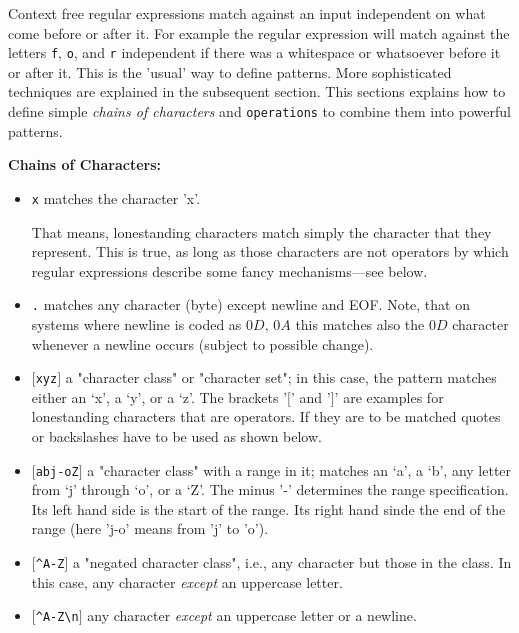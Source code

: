 Context free regular expressions match against an input independent on what 
 come before or after it. For example the regular expression 
 will match against the letters {\tt f}, {\tt o}, and {\tt r} independent
 if there was a whitespace or whatsoever before it or after it. This is
 the 'usual' way to define patterns. More sophisticated techniques are 
 explained in the subsequent section. This sections explains how to 
 define simple {\it chains of characters} and {\tt operations}
 to combine them into powerful patterns.
 \vskip0.5cm

{\bf Chains of Characters:}

\begin{itemize}
\item {\tt x} matches the character 'x'. 

     That means, lonestanding characters match simply the character that they represent.
     This is true, as long as those characters are not operators by which regular
     expressions describe some fancy mechanisms---see below.

\item {\tt .} matches any character (byte) except newline and EOF. Note, that on systems
      where newline is coded as $0D,\,0A$ this matches also the $0D$ character whenever 
      a newline occurs (subject to possible change).

\item {\tt $[$xyz$]$}
     a "character class" or "character set"; in this case, the pattern matches either an
     `x', a `y', or a `z'. The brackets '$[$' and '$]$' are examples for lonestanding
     characters that are operators. If they are to be matched quotes or backslashes
     have to be used as shown below.

\item {\tt $[$abj-oZ$]$}
     a "character class" with a range in it; matches an `a', a `b', any
     letter from `j' through `o', or a `Z'. The minus '-' determines the
     range specification. Its left hand side is the start of the range.
     Its right hand sinde the end of the range (here 'j-o' means from 'j' to 'o').

\item {\tt $[$\verb|^|A-Z$]$}
     a "negated character class", i.e., any character but those in the
     class.  In this case, any character {\it except} an uppercase letter.

\item {\tt $[$\verb|^|A-Z\verb|\|n$]$}
     any character {\it except} an uppercase letter or a newline.


\end{itemize}
